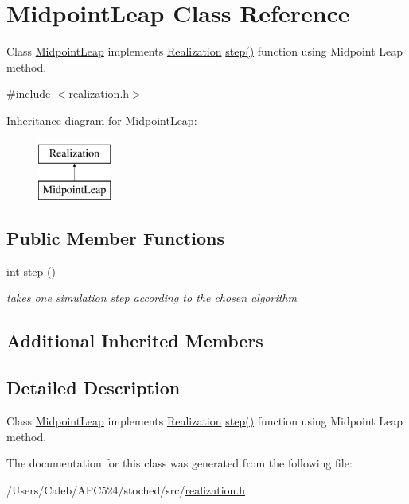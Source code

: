 \hypertarget{class_midpoint_leap}{}\section{Midpoint\+Leap Class Reference}
\label{class_midpoint_leap}


Class \hyperlink{class_midpoint_leap}{Midpoint\+Leap} implements \hyperlink{class_realization}{Realization} \hyperlink{class_midpoint_leap_a8afc1a6a8777157f7b42ec08a848b564}{step()} function using Midpoint Leap method.  




{\ttfamily \#include $<$realization.\+h$>$}

Inheritance diagram for Midpoint\+Leap\+:\begin{figure}[H]
\begin{center}
\leavevmode
\includegraphics[height=2.000000cm]{class_midpoint_leap}
\end{center}
\end{figure}
\subsection*{Public Member Functions}
\begin{DoxyCompactItemize}
\item 
\mbox{\label{class_midpoint_leap_a8afc1a6a8777157f7b42ec08a848b564}} 
int \hyperlink{class_midpoint_leap_a8afc1a6a8777157f7b42ec08a848b564}{step} ()
\begin{DoxyCompactList}\small\item\em takes one simulation step according to the chosen algorithm \end{DoxyCompactList}\end{DoxyCompactItemize}
\subsection*{Additional Inherited Members}


\subsection{Detailed Description}
Class \hyperlink{class_midpoint_leap}{Midpoint\+Leap} implements \hyperlink{class_realization}{Realization} \hyperlink{class_midpoint_leap_a8afc1a6a8777157f7b42ec08a848b564}{step()} function using Midpoint Leap method. 

The documentation for this class was generated from the following file\+:\begin{DoxyCompactItemize}
\item 
/\+Users/\+Caleb/\+A\+P\+C524/stoched/src/\hyperlink{realization_8h}{realization.\+h}\end{DoxyCompactItemize}
